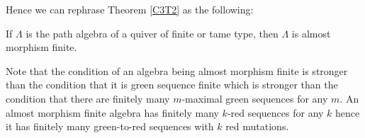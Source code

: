 \indent Hence we can rephrase Theorem \ref{C3T2} as the following:
\begin{theorem}
If $\Lambda$ is the path algebra of a quiver of finite or tame type, then $\Lambda$ is almost morphism finite.
\end{theorem}
\indent Note that the condition of an algebra being almost morphism finite is stronger than the condition that it is green sequence finite which is stronger than the condition that there are finitely many $m$-maximal green sequences for any $m$. An almost morphism finite algebra has finitely many $k$-red sequences for any $k$ hence it has finitely many green-to-red sequences with $k$ red mutations.\\